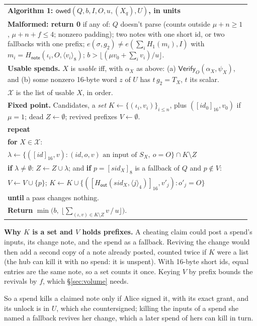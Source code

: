 \documentclass[11pt]{article}
\theoremstyle{plain}
\theoremstyle{definition}
\newcommand{\be}[2]{\langle #1\rangle_{#2}}
\newcommand{\pre}[2]{[#1]_{#2}}
\newcommand{\Ht}[1]{H_{\textsf{#1}}}
\newcommand{\Vfy}{\mathsf{Verify}}
\newcommand{\sid}{\mathit{sid}}
\newcommand{\owed}{\mathsf{owed}}
\newcommand{\Hg}{H_{1}}
\newenvironment{algobox}[1]
  {\par\smallskip\noindent\begin{tabular}{|p{0.955\linewidth}|}\hline\textbf{#1}\\[2pt]}
  {\\\hline\end{tabular}\par\smallskip}
\begin{document}
\begin{algobox}{Algorithm 1: $\owed(Q, b, I, O, u, (X_q), U)$, in units}
\textbf{Malformed: return 0} if any of:
$Q$ doesn't parse (counts outside $\mu + n \ge 1$, $\mu + n + f \le 4$; nonzero padding);
two notes with one short id, or two fallbacks with one prefix;
$e(\sigma, g_2) \ne e(\sum_i \Hg(m_i), I)$ with $m_i = \Ht{note}(\iota_i, O, \be{v_i}{8})$;
$b > \lfloor (\mu v_0 + \sum_i v_i) / u\rfloor$.\\[3pt]
\textbf{Usable spends.} $X$ is \emph{usable} iff, with $\alpha_X$ as above:
\quad (a) $\Vfy_O(\alpha_X, \psi_X)$, and
\quad (b) some nonzero 16-byte word $z$ of $U$ has $t\,g_2 = T_X$, $t$ its scalar.\\
$\mathcal{X}$ is the list of usable $X$, in order.\\[3pt]
\textbf{Fixed point.} Candidates, a \emph{set} $K \leftarrow \{(\iota_i, v_i)\}_{i \le n}$, plus $(\pre{\mathit{id}_0}{16}, v_0)$ if $\mu = 1$; dead $Z \leftarrow \emptyset$; revived prefixes $V \leftarrow \emptyset$.\\
\textbf{repeat}\\
\quad \textbf{for} $X \in \mathcal{X}$:\\
\quad\quad $\lambda \leftarrow \{(\pre{\mathit{id}}{16}, v) : (\mathit{id}, o, v) \text{ an input of } S_X,\ o = O\} \cap K \setminus Z$\\
\quad\quad \textbf{if} $\lambda \ne \emptyset$: $Z \leftarrow Z \cup \lambda$; and \textbf{if} $p = \pre{\sid_X}{8}$ is a fallback of $Q$ and $p \notin V$:\\
\quad\quad\quad $V \leftarrow V \cup \{p\}$; $K \leftarrow K \cup \{(\pre{\Ht{out}(\sid_X, \be{j}{4})}{16}, v'_j) : o'_j = O\}$\\
\textbf{until} a pass changes nothing.\\[3pt]
\textbf{Return} $\min\big(b,\ \big\lfloor \sum_{(\iota, v) \in K \setminus Z} v \,/\, u \big\rfloor\big)$.
\end{algobox}

\textbf{Why $K$ is a set and $V$ holds prefixes.} A cheating claim
could post a spend's inputs, its change note, and the spend as a
fallback. Reviving the change would then add a second copy of a note
already posted, counted twice if $K$ were a list (the hub can kill it
with no spend: it is unspent). With 16-byte short ids, equal entries are
the same note, so a set counts it once. Keying $V$ by prefix bounds the
revivals by $f$, which \S\ref{sec:volume} needs.

So a spend kills a claimed note only if Alice signed it, with its exact
grant, and its unlock is in $U$, which she countersigned; killing the
inputs of a spend she named a fallback revives her change, which a later
spend of hers can kill in turn.
\end{document}
